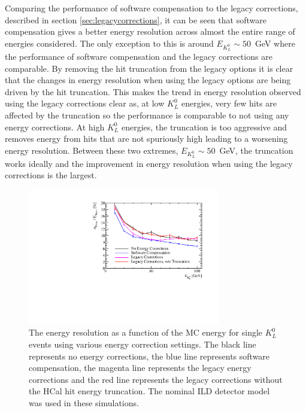 Comparing the performance of software compensation to the legacy corrections, described in section \ref{sec:legacycorrections}, it can be seen that software compensation gives a better energy resolution across almost the entire range of energies considered.  The only exception to this is around $E_{K^{0}_{L}} \sim 50$~GeV where the performance of software compensation and the legacy corrections are comparable.  By removing the hit truncation from the legacy options it is clear that the changes in energy resolution when using the legacy options are being driven by the hit truncation.  This makes the trend in energy resolution observed using the legacy corrections clear as, at low $K^{0}_{L}$ energies, very few hits are affected by the truncation so the performance is comparable to not using any energy corrections.  At high $K^{0}_{L}$ energies, the truncation is too aggressive and removes energy from hits that are not spuriously high leading to a worsening energy resolution.  Between these two extremes, $E_{K^{0}_{L}} \sim 50$~GeV, the truncation works ideally and the improvement in energy resolution when using the legacy corrections is the largest.  

\begin{figure}[h!]
\includegraphics[width=0.75\textwidth]{EnergyEstimators/Plots/SoftComp/EnergyResolution/ER_vs_Kaon0LSoftComp_Kaon0L.pdf}
\caption[The energy resolution as a function of the MC energy for single $K^{0}_{L}$ events using various energy correction settings.  The black line represents no energy corrections, the blue line represents software compensation, the magenta line represents the legacy energy corrections and the red line represents the legacy corrections without the HCal hit energy truncation.  The nominal ILD detector model was used in these simulations.]{The energy resolution as a function of the MC energy for single $K^{0}_{L}$ events using various energy correction settings.  The black line represents no energy corrections, the blue line represents software compensation, the magenta line represents the legacy energy corrections and the red line represents the legacy corrections without the HCal hit energy truncation.  The nominal ILD detector model was used in these simulations.}
\label{fig:ersoftcomp}
\end{figure}

